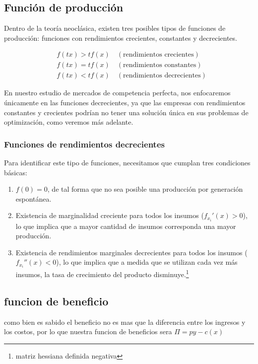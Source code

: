 \documentclass[11pt]{article}
\begin{document}
\subsection{Función de producción}
\begin{flushleft}
    Dentro de la teoría neoclásica, existen tres posibles tipos de funciones de producción: funciones con rendimientos crecientes, constantes y decrecientes.

    \begin{align*}
        &f(tx) > tf(x) \quad (\text{rendimientos crecientes})\\
        &f(tx) = tf(x) \quad (\text{rendimientos constantes})\\
        &f(tx) < tf(x) \quad (\text{rendimientos decrecientes})
    \end{align*}

    En nuestro estudio de mercados de competencia perfecta, nos enfocaremos únicamente en las funciones decrecientes, ya que las empresas con rendimientos constantes y crecientes podrían no tener una solución única en sus problemas de optimización, como veremos más adelante.

    \subsubsection{Funciones de rendimientos decrecientes}
    Para identificar este tipo de funciones, necesitamos que cumplan tres condiciones básicas:
    
    \begin{enumerate}
        \item $f(0) = 0$, de tal forma que no sea posible una producción por generación espontánea.
    
        \item Existencia de marginalidad creciente para todos los insumos ($f_{x_i}'(x) > 0$), lo que implica que a mayor cantidad de insumos corresponda una mayor producción.
    
        \item Existencia de rendimientos marginales decrecientes para todos los insumos ($f_{x_i}''(x) < 0$), lo que implica que a medida que se utilizan cada vez más insumos, la tasa de crecimiento del producto disminuye.\footnote{matriz hessiana definida negativa}
    \end{enumerate}
\end{flushleft}

\subsection{funcion de beneficio}
\begin{flushleft}
    como bien es sabido el beneficio no es mas que la diferencia entre los ingresos y los costos, por lo que nuestra funcion de beneficios sera $\Pi = py-c(x)$
\end{flushleft}
\end{document}
